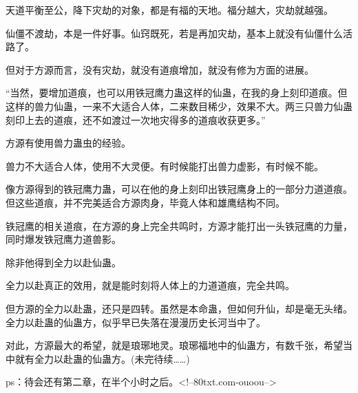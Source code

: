 \begin{this_body}
天道平衡至公，降下灾劫的对象，都是有福的天地。福分越大，灾劫就越强。

仙僵不渡劫，本是一件好事。仙窍既死，若是再加灾劫，基本上就没有仙僵什么活路了。

但对于方源而言，没有灾劫，就没有道痕增加，就没有修为方面的进展。

“当然，要增加道痕，也可以用铁冠鹰力蛊这样的仙蛊，在我的身上刻印道痕。但这样的兽力仙蛊，一来不大适合人体，二来数目稀少，效果不大。两三只兽力仙蛊刻印上去的道痕，还不如渡过一次地灾得多的道痕收获更多。”

方源有使用兽力蛊虫的经验。

兽力不大适合人体，使用不大灵便。有时候能打出兽力虚影，有时候不能。

像方源得到的铁冠鹰力蛊，可以在他的身上刻印出铁冠鹰身上的一部分力道道痕。但这些道痕，并不完美适合方源肉身，毕竟人体和雄鹰结构不同。

铁冠鹰的相关道痕，在方源的身上完全共鸣时，方源才能打出一头铁冠鹰的力量，同时爆发铁冠鹰力道兽影。

除非他得到全力以赴仙蛊。

全力以赴真正的效用，就是能时刻将人体上的力道道痕，完全共鸣。

但方源的全力以赴蛊，还只是四转。虽然是本命蛊，但如何升仙，却是毫无头绪。全力以赴蛊的仙蛊方，似乎早已失落在漫漫历史长河当中了。

对此，方源最大的希望，就是琅琊地灵。琅琊福地中的仙蛊方，有数千张，希望当中就有全力以赴蛊的仙蛊方。(未完待续……)

ps：待会还有第二章，在半个小时之后。<!--80txt.com-ouoou-->

\end{this_body}

